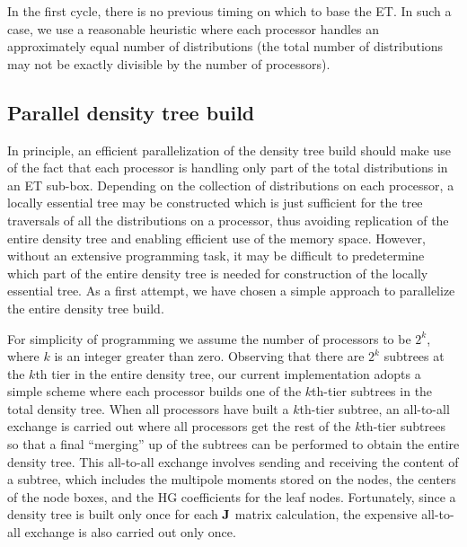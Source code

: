\commentoutA{\documentclass[prl,aps,twocolumn,twocolumngrid,superbib]{revtex4}}
\begin{document}
In the first cycle, there is no previous timing on which to base the
ET. In such a case, we use a reasonable heuristic where each processor
handles an approximately equal number of distributions (the total
number of distributions may not be exactly divisible by the number of
processors).

\subsection{Parallel density tree build} 
\label{sec:parallelTB}

In principle, an efficient parallelization of the density tree build
should make use of the fact that each processor is handling only part
of the total distributions in an ET sub-box.  Depending on the
collection of distributions on each processor, a locally essential
tree\cite{MWarren92,CGan03} may be constructed which is just sufficient for the tree
traversals of all the distributions on a
processor, thus avoiding replication of the
entire density tree and enabling efficient use of the memory space.
However, without an extensive programming task, it may be difficult to
predetermine which part of the entire density tree is needed for
construction of the locally essential tree. As a first attempt, we
have chosen a simple approach to parallelize the entire density tree
build.

For simplicity of programming we assume the number of processors to be
$2^k$, where $k$ is an integer greater than zero.  Observing that
there are $2^k$ subtrees at the $k$th tier in the entire density tree,
our current implementation adopts a simple scheme where each processor
builds one of the $k$th-tier subtrees in the total density tree. When
all processors have built a $k$th-tier subtree, an all-to-all exchange
is carried out where all processors get the rest of the $k$th-tier
subtrees so that a final ``merging'' up of the
subtrees\cite{MChallacombe97,CTymczak04a} can be performed to obtain
the entire density tree. 
This all-to-all exchange involves 
sending and receiving the content of a subtree, 
which includes the multipole moments stored on the nodes, the
centers of the node boxes, and the HG coefficients for the leaf nodes. 
Fortunately, since a density tree is built only once for each ${\bf J}$ matrix
calculation, the expensive all-to-all exchange 
is also carried out only once.
\end{document}
